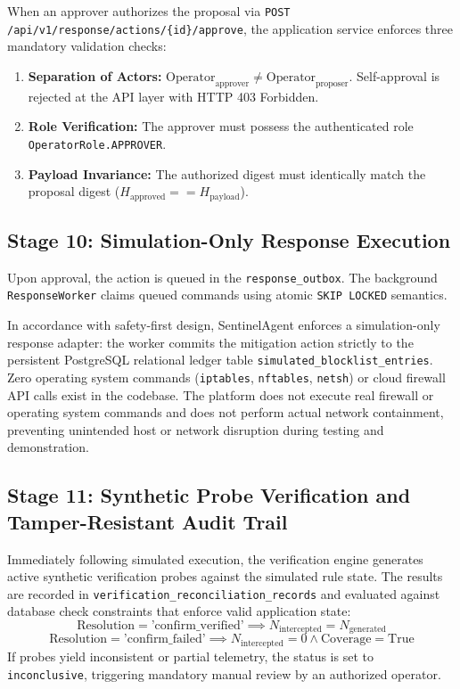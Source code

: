 \documentclass[conference]{IEEEtran}
\begin{document}
When an approver authorizes the proposal via \texttt{POST /api/v1/response/actions/\{id\}/approve}, the application service enforces three mandatory validation checks:
\begin{enumerate}
    \item \textbf{Separation of Actors:} $\text{Operator}_{\text{approver}} \neq \text{Operator}_{\text{proposer}}$. Self-approval is rejected at the API layer with HTTP 403 Forbidden.
    \item \textbf{Role Verification:} The approver must possess the authenticated role \texttt{OperatorRole.APPROVER}.
    \item \textbf{Payload Invariance:} The authorized digest must identically match the proposal digest ($H_{\text{approved}} == H_{\text{payload}}$).
\end{enumerate}

\subsection{Stage 10: Simulation-Only Response Execution}
Upon approval, the action is queued in the \texttt{response\_outbox}. The background \texttt{ResponseWorker} claims queued commands using atomic \texttt{SKIP LOCKED} semantics.

In accordance with safety-first design, SentinelAgent enforces a simulation-only response adapter: the worker commits the mitigation action strictly to the persistent PostgreSQL relational ledger table \texttt{simulated\_blocklist\_entries}. Zero operating system commands (\texttt{iptables}, \texttt{nftables}, \texttt{netsh}) or cloud firewall API calls exist in the codebase. The platform does not execute real firewall or operating system commands and does not perform actual network containment, preventing unintended host or network disruption during testing and demonstration.

\subsection{Stage 11: Synthetic Probe Verification and Tamper-Resistant Audit Trail}
Immediately following simulated execution, the verification engine generates active synthetic verification probes against the simulated rule state. The results are recorded in \texttt{verification\_reconciliation\_records} and evaluated against database check constraints that enforce valid application state:
\begin{equation}
\text{Resolution} = \text{'confirm\_verified'} \implies N_{\text{intercepted}} = N_{\text{generated}}
\end{equation}
\begin{equation}
\text{Resolution} = \text{'confirm\_failed'} \implies N_{\text{intercepted}} = 0 \land \text{Coverage} = \text{True}
\end{equation}
If probes yield inconsistent or partial telemetry, the status is set to \texttt{inconclusive}, triggering mandatory manual review by an authorized operator.
\end{document}
